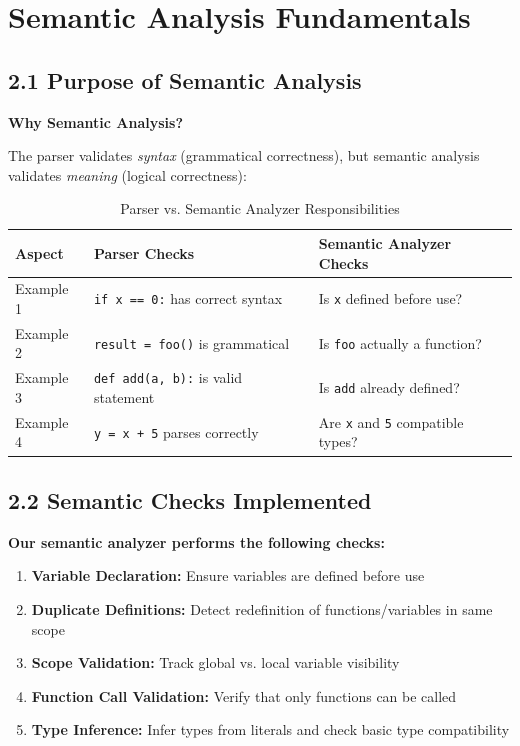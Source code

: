 \documentclass[a4paper,11pt]{article}
\begin{document}
    \section{Semantic Analysis Fundamentals}

    \subsection{2.1 Purpose of Semantic Analysis}

    \textbf{Why Semantic Analysis?}

    The parser validates \textit{syntax} (grammatical correctness), but semantic analysis validates \textit{meaning} (logical correctness):

    \begin{table}[h]
    \centering
    \begin{tabularx}{\textwidth}{|l|X|X|}
    \hline
    \rowcolor{blue!10}
    \textbf{Aspect} & \textbf{Parser Checks} & \textbf{Semantic Analyzer Checks} \\
    \hline
    Example 1 & \texttt{if x == 0:} has correct syntax & Is \texttt{x} defined before use? \\
    \hline
    Example 2 & \texttt{result = foo()} is grammatical & Is \texttt{foo} actually a function? \\
    \hline
    Example 3 & \texttt{def add(a, b):} is valid statement & Is \texttt{add} already defined? \\
    \hline
    Example 4 & \texttt{y = x + 5} parses correctly & Are \texttt{x} and \texttt{5} compatible types? \\
    \hline
    \end{tabularx}
    \caption{Parser vs. Semantic Analyzer Responsibilities}
    \end{table}

    \subsection{2.2 Semantic Checks Implemented}

    \textbf{Our semantic analyzer performs the following checks:}

    \begin{enumerate}
        \item \textbf{Variable Declaration:} Ensure variables are defined before use
        \item \textbf{Duplicate Definitions:} Detect redefinition of functions/variables in same scope
        \item \textbf{Scope Validation:} Track global vs. local variable visibility
        \item \textbf{Function Call Validation:} Verify that only functions can be called
        \item \textbf{Type Inference:} Infer types from literals and check basic type compatibility
    \end{enumerate}
\end{document}
